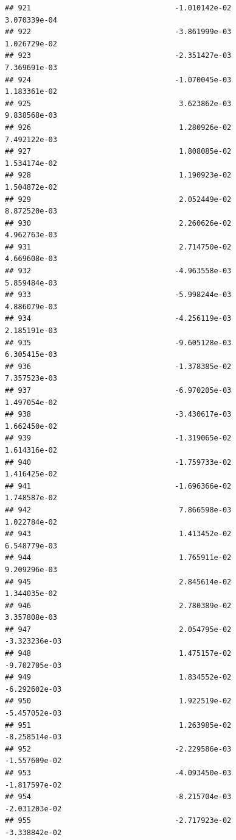 \documentclass[
]{article}
\begin{document}
\begin{verbatim}
## 921                                 -1.010142e-02           3.070339e-04
## 922                                 -3.861999e-03           1.026729e-02
## 923                                 -2.351427e-03           7.369691e-03
## 924                                 -1.070045e-03           1.183361e-02
## 925                                  3.623862e-03           9.838568e-03
## 926                                  1.280926e-02           7.492122e-03
## 927                                  1.808085e-02           1.534174e-02
## 928                                  1.190923e-02           1.504872e-02
## 929                                  2.052449e-02           8.872520e-03
## 930                                  2.260626e-02           4.962763e-03
## 931                                  2.714750e-02           4.669608e-03
## 932                                 -4.963558e-03           5.859484e-03
## 933                                 -5.998244e-03           4.886079e-03
## 934                                 -4.256119e-03           2.185191e-03
## 935                                 -9.605128e-03           6.305415e-03
## 936                                 -1.378385e-02           7.357523e-03
## 937                                 -6.970205e-03           1.497054e-02
## 938                                 -3.430617e-03           1.662450e-02
## 939                                 -1.319065e-02           1.614316e-02
## 940                                 -1.759733e-02           1.416425e-02
## 941                                 -1.696366e-02           1.748587e-02
## 942                                  7.866598e-03           1.022784e-02
## 943                                  1.413452e-02           6.548779e-03
## 944                                  1.765911e-02           9.209296e-03
## 945                                  2.845614e-02           1.344035e-02
## 946                                  2.780389e-02           3.357808e-03
## 947                                  2.054795e-02          -3.323236e-03
## 948                                  1.475157e-02          -9.702705e-03
## 949                                  1.834552e-02          -6.292602e-03
## 950                                  1.922519e-02          -5.457052e-03
## 951                                  1.263985e-02          -8.258514e-03
## 952                                 -2.229586e-03          -1.557609e-02
## 953                                 -4.093450e-03          -1.817597e-02
## 954                                 -8.215704e-03          -2.031203e-02
## 955                                 -2.717923e-02          -3.338842e-02

\end{verbatim}
\end{document}
